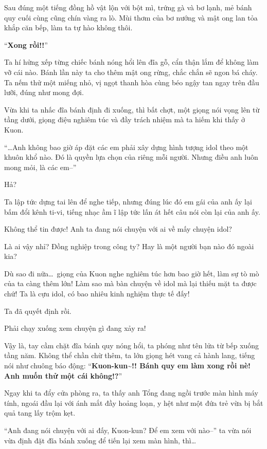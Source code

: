 \documentclass[../main.tex]{subfiles}
\begin{document}
\ct

Sau đúng một tiếng đồng hồ vật lộn với bột mì, trứng gà và bơ lạnh, mẻ bánh quy cuối cùng cũng chín vàng ra lò. Mùi thơm của bơ nướng và mật ong lan tỏa khắp căn bếp, làm ta tự hào không thôi.

``\textbf{Xong rồi!!}''

Ta hí hửng xếp từng chiếc bánh nóng hổi lên đĩa gỗ, cẩn thận lắm để không làm vỡ cái nào. Bánh lần này ta cho thêm mật ong rừng, chắc chắn sẽ ngon bá cháy. Ta nếm thử một miếng nhỏ, vị ngọt thanh hòa cùng béo ngậy tan ngay trên đầu lưỡi, đúng như mong đợi.

Vừa khi ta nhấc đĩa bánh định đi xuống, thì bất chợt, một giọng nói vọng lên từ tầng dưới, giọng điệu nghiêm túc và đầy trách nhiệm mà ta hiếm khi thấy ở Kuon.

``\dots Anh không bao giờ áp đặt các em phải xây dựng hình tượng idol theo một khuôn khổ nào. Đó là quyền lựa chọn của riêng mỗi người. Nhưng điều anh luôn mong mỏi, là các em--''

Hả?

Ta lập tức dựng tai lên để nghe tiếp, nhưng đúng lúc đó em gái của anh ấy lại bấm đổi kênh ti-vi, tiếng nhạc ầm ĩ lập tức lấn át hết câu nói còn lại của anh ấy.

Không thể tin được! Anh ta đang nói chuyện với ai về mấy chuyện idol?

Là ai vậy nhỉ? Đồng nghiệp trong công ty? Hay là một người bạn nào đó ngoài kia?

Dù sao đi nữa\dots\ giọng của Kuon nghe nghiêm túc hơn bao giờ hết, làm sự tò mò của ta càng thêm lớn! Làm sao mà bàn chuyện về idol mà lại thiếu mặt ta được chứ! Ta là cựu idol, có bao nhiêu kinh nghiệm thực tế đấy!

Ta đã quyết định rồi.

Phải chạy xuống xem chuyện gì đang xảy ra!

Vậy là, tay cầm chặt đĩa bánh quy nóng hổi, ta phóng như tên lửa từ bếp xuống tầng năm. Không thể chần chừ thêm, ta lớn giọng hét vang cả hành lang, tiếng nói như chuông báo động: ``\textbf{Kuon-kun\~{}!! Bánh quy em làm xong rồi nè! Anh muốn thử một cái không!?}''

Ngay khi ta đẩy cửa phòng ra, ta thấy anh Tổng đang ngồi trước màn hình máy tính, ngoái đầu lại với ánh mắt đầy hoảng loạn, y hệt như một đứa trẻ vừa bị bắt quả tang lấy trộm kẹt.

``Anh đang nói chuyện với ai đấy, Kuon-kun? Để em xem với nào--'' ta vừa nói vừa định đặt đĩa bánh xuống để tiến lại xem màn hình, thì\dots
\end{document}
